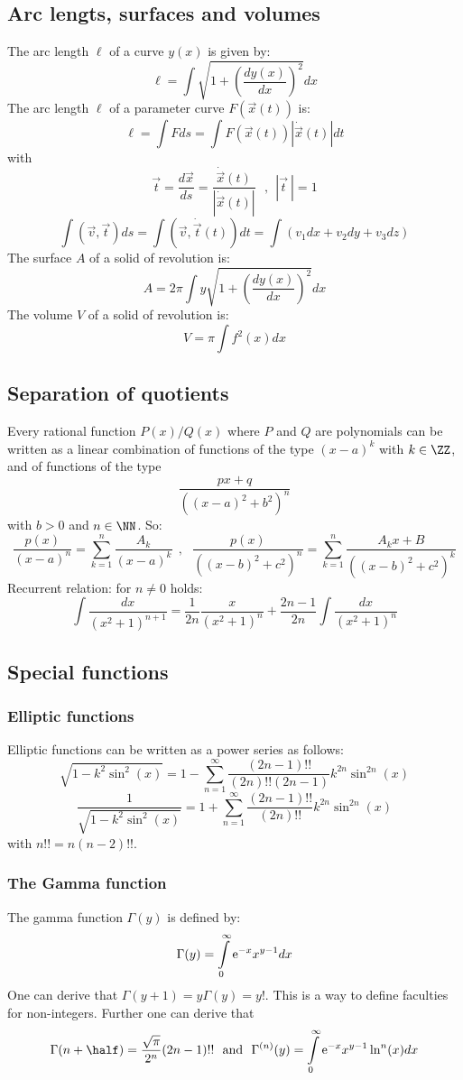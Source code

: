 \subsection{Arc lengts, surfaces and volumes}
The arc length $\ell$ of a curve $y(x)$ is given by:
\[
\ell=\int\sqrt{1+\left(\frac{dy(x)}{dx}\right)^2}dx
\]
The arc length $\ell$ of a parameter curve $F(\vec{x}(t))$ is:
\[
\ell=\int Fds=\int F(\vec{x}(t))|\dot{\vec{x}}(t)|dt
\]
with
\[
\vec{t}=\frac{d\vec{x}}{ds}=\frac{\dot{\vec{x}}(t)}{|\dot{\vec{x}}(t)|}~~~,~~|\vec{t}~|=1
\]
\[
\int(\vec{v},\vec{t})ds=\int(\vec{v},\dot{\vec{t}}(t))dt=\int(v_1dx+v_2dy+v_3dz)
\]
The surface $A$ of a solid of revolution is:
\[
A=2\pi\int y\sqrt{1+\left(\frac{dy(x)}{dx}\right)^2}dx
\]
The volume $V$ of a solid of revolution is:
\[
V=\pi\int f^2(x)dx
\]

\subsection{Separation of quotients}
\label{sec:breuksplits}
Every rational function $P(x)/Q(x)$ where $P$ and $Q$ are polynomials can be
written as a linear combination of functions of the type $(x-a)^k$ with
$k\in\ZZ$, and of functions of the type
\[
\frac{px+q}{((x-a)^2+b^2)^n}
\]
with $b>0$ and $n\in\NN$. So:
\[
\frac{p(x)}{(x-a)^n}=\sum_{k=1}^n\frac{A_k}{(x-a)^k}~~,~~~
\frac{p(x)}{((x-b)^2+c^2)^n}=\sum_{k=1}^n \frac{A_kx+B}{((x-b)^2+c^2)^k}
\]
Recurrent relation: for $n\neq0$ holds:
\[
\int\frac{dx}{(x^2+1)^{n+1}}=\frac{1}{2n}\frac{x}{(x^2+1)^n}+\frac{2n-1}{2n}\int\frac{dx}{(x^2+1)^n}
\]

\subsection{Special functions}
\subsubsection{Elliptic functions}
Elliptic functions can be written as a power series as follows:
\[
\sqrt{1-k^2\sin^2(x)}=1-\sum_{n=1}^\infty\frac{(2n-1)!!}{(2n)!!(2n-1)}k^{2n}\sin^{2n}(x)
\]
\[
\frac{1}{\sqrt{1-k^2\sin^2(x)}}=1+\sum_{n=1}^\infty\frac{(2n-1)!!}{(2n)!!}k^{2n}\sin^{2n}(x)
\]
with $n!!=n(n-2)!!$.

\subsubsection{The Gamma function}
The gamma function $\Gamma(y)$ is defined by:
\[
\Gamma(y)=\int\limits_0^\infty{\rm e}^{-x}x^{y-1}dx
\]
One can derive that $\Gamma(y+1)=y\Gamma(y)=y!$. This is a way to define
faculties for non-integers. Further one can derive that
\[
\Gamma(n+\half)=\frac{\sqrt{\pi}}{2^n}(2n-1)!!~~\mbox{and}~~
\Gamma^{(n)}(y)=\int\limits_0^\infty{\rm e}^{-x}x^{y-1}\ln^n(x)dx
\]

